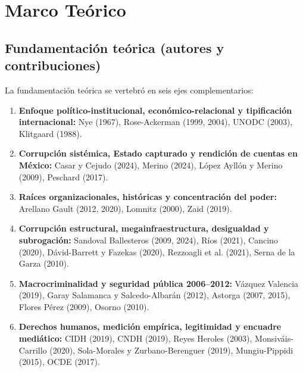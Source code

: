 \documentclass[12pt,letterpaper,oneside]{article}
\begin{document}
\clearpage


\section{Marco Teórico}

\subsection{Fundamentación teórica (autores y contribuciones)}

La fundamentación teórica se vertebró en seis ejes complementarios:

\begin{enumerate}
  \item \textbf{Enfoque político-institucional, económico-relacional y tipificación internacional:} Nye (1967), Rose-Ackerman (1999, 2004), UNODC (2003), Klitgaard (1988).
  
  \item \textbf{Corrupción sistémica, Estado capturado y rendición de cuentas en México:} Casar y Cejudo (2024), Merino (2024), López Ayllón y Merino (2009), Peschard (2017).
  
  \item \textbf{Raíces organizacionales, históricas y concentración del poder:} Arellano Gault (2012, 2020), Lomnitz (2000), Zaid (2019).
  
  \item \textbf{Corrupción estructural, megainfraestructura, desigualdad y subrogación:} Sandoval Ballesteros (2009, 2024), Ríos (2021), Cancino (2020), Dávid-Barrett y Fazekas (2020), Rezzoagli et al. (2021), Serna de la Garza (2010).
  
  \item \textbf{Macrocriminalidad y seguridad pública 2006--2012:} Vázquez Valencia (2019), Garay Salamanca y Salcedo-Albarán (2012), Astorga (2007, 2015), Flores Pérez (2009), Osorno (2010).
  
  \item \textbf{Derechos humanos, medición empírica, legitimidad y encuadre mediático:} CIDH (2019), CNDH (2019), Reyes Heroles (2003), Monsiváis-Carrillo (2020), Sola-Morales y Zurbano-Berenguer (2019), Mungiu-Pippidi (2015), OCDE (2017).
\end{enumerate}
\end{document}
